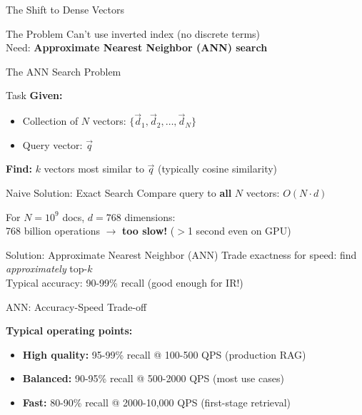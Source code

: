 \documentclass[aspectratio=169]{beamer}
\begin{document}
\begin{frame}[shrink=10]{The Shift to Dense Vectors}
\vspace{1em}

\begin{alertblock}{The Problem}
Can't use inverted index (no discrete terms) \\
Need: \textbf{Approximate Nearest Neighbor (ANN) search}
\end{alertblock}
\end{frame}

\begin{frame}[shrink=15]{The ANN Search Problem}
\begin{block}{Task}
\textbf{Given:}
\begin{itemize}
    \item Collection of $N$ vectors: $\{\vec{d}_1, \vec{d}_2, \ldots, \vec{d}_N\}$
    \item Query vector: $\vec{q}$
\end{itemize}

\textbf{Find:} $k$ vectors most similar to $\vec{q}$ (typically cosine similarity)
\end{block}

\vspace{1em}

\begin{alertblock}{Naive Solution: Exact Search}
Compare query to \textbf{all} $N$ vectors: $O(N \cdot d)$

\vspace{0.5em}

For $N = 10^9$ docs, $d = 768$ dimensions: \\
768 billion operations $\rightarrow$ \textbf{too slow!} ($>$1 second even on GPU)
\end{alertblock}

\vspace{1em}

\begin{exampleblock}{Solution: Approximate Nearest Neighbor (ANN)}
Trade exactness for speed: find \textit{approximately} top-$k$ \\
Typical accuracy: 90-99\% recall (good enough for IR!)
\end{exampleblock}
\end{frame}

\begin{frame}[shrink=5]{ANN: Accuracy-Speed Trade-off}
\begin{center}

\end{center}

\vspace{0.5em}

\textbf{Typical operating points:}
\begin{itemize}
    \item \textbf{High quality:} 95-99\% recall @ 100-500 QPS (production RAG)
    \item \textbf{Balanced:} 90-95\% recall @ 500-2000 QPS (most use cases)
    \item \textbf{Fast:} 80-90\% recall @ 2000-10,000 QPS (first-stage retrieval)
\end{itemize}
\end{frame}
\end{document}
